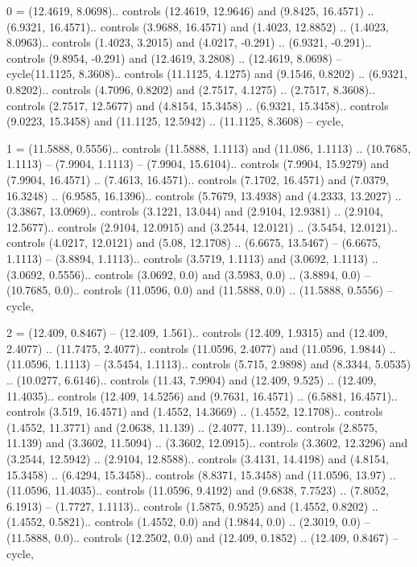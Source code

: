 0 = {(12.4619, 8.0698).. controls (12.4619, 12.9646) and (9.8425, 16.4571) .. (6.9321, 16.4571).. controls (3.9688, 16.4571) and (1.4023, 12.8852) .. (1.4023, 8.0963).. controls (1.4023, 3.2015) and (4.0217, -0.291) .. (6.9321, -0.291).. controls (9.8954, -0.291) and (12.4619, 3.2808) .. (12.4619, 8.0698) -- cycle(11.1125, 8.3608).. controls (11.1125, 4.1275) and (9.1546, 0.8202) .. (6.9321, 0.8202).. controls (4.7096, 0.8202) and (2.7517, 4.1275) .. (2.7517, 8.3608).. controls (2.7517, 12.5677) and (4.8154, 15.3458) .. (6.9321, 15.3458).. controls (9.0223, 15.3458) and (11.1125, 12.5942) .. (11.1125, 8.3608) -- cycle},

1 = {(11.5888, 0.5556).. controls (11.5888, 1.1113) and (11.086, 1.1113) .. (10.7685, 1.1113) -- (7.9904, 1.1113) -- (7.9904, 15.6104).. controls (7.9904, 15.9279) and (7.9904, 16.4571) .. (7.4613, 16.4571).. controls (7.1702, 16.4571) and (7.0379, 16.3248) .. (6.9585, 16.1396).. controls (5.7679, 13.4938) and (4.2333, 13.2027) .. (3.3867, 13.0969).. controls (3.1221, 13.044) and (2.9104, 12.9381) .. (2.9104, 12.5677).. controls (2.9104, 12.0915) and (3.2544, 12.0121) .. (3.5454, 12.0121).. controls (4.0217, 12.0121) and (5.08, 12.1708) .. (6.6675, 13.5467) -- (6.6675, 1.1113) -- (3.8894, 1.1113).. controls (3.5719, 1.1113) and (3.0692, 1.1113) .. (3.0692, 0.5556).. controls (3.0692, 0.0) and (3.5983, 0.0) .. (3.8894, 0.0) -- (10.7685, 0.0).. controls (11.0596, 0.0) and (11.5888, 0.0) .. (11.5888, 0.5556) -- cycle},

2 = {(12.409, 0.8467) -- (12.409, 1.561).. controls (12.409, 1.9315) and (12.409, 2.4077) .. (11.7475, 2.4077).. controls (11.0596, 2.4077) and (11.0596, 1.9844) .. (11.0596, 1.1113) -- (3.5454, 1.1113).. controls (5.715, 2.9898) and (8.3344, 5.0535) .. (10.0277, 6.6146).. controls (11.43, 7.9904) and (12.409, 9.525) .. (12.409, 11.4035).. controls (12.409, 14.5256) and (9.7631, 16.4571) .. (6.5881, 16.4571).. controls (3.519, 16.4571) and (1.4552, 14.3669) .. (1.4552, 12.1708).. controls (1.4552, 11.3771) and (2.0638, 11.139) .. (2.4077, 11.139).. controls (2.8575, 11.139) and (3.3602, 11.5094) .. (3.3602, 12.0915).. controls (3.3602, 12.3296) and (3.2544, 12.5942) .. (2.9104, 12.8588).. controls (3.4131, 14.4198) and (4.8154, 15.3458) .. (6.4294, 15.3458).. controls (8.8371, 15.3458) and (11.0596, 13.97) .. (11.0596, 11.4035).. controls (11.0596, 9.4192) and (9.6838, 7.7523) .. (7.8052, 6.1913) -- (1.7727, 1.1113).. controls (1.5875, 0.9525) and (1.4552, 0.8202) .. (1.4552, 0.5821).. controls (1.4552, 0.0) and (1.9844, 0.0) .. (2.3019, 0.0) -- (11.5888, 0.0).. controls (12.2502, 0.0) and (12.409, 0.1852) .. (12.409, 0.8467) -- cycle},

